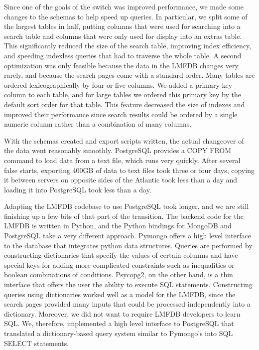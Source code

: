 \documentclass{article}
\begin{document}
Since one of the goals of the switch was improved performance, we made some changes to the schemas to help speed up queries.
In particular, we split some of the largest tables in half, putting columns that were used for searching into a search table and columns that were only used for display into an extras table.
This significantly reduced the size of the search table, improving index efficiency, and speeding indexless queries that had to traverse the whole table.
A second optimization was only feasible because the data in the LMFDB changes very rarely, and because the search pages come with a standard order.
Many tables are ordered lexicographically by four or five columns.
We added a primary key column to each table, and for large tables we ordered this primary key by the default sort order for that table.
This feature decreased the size of indexes and improved their performance since search results could be ordered by a single numeric column rather than a combination of many columns.

With the schemas created and export scripts written, the actual changeover of the data went reasonably smoothly.
PostgreSQL provides a COPY FROM command to load data from a text file, which runs very quickly.
After several false starts, exporting 400GB of data to text files took three or four days, copying it between servers on opposite sides of the Atlantic took less than a day and loading it into PostgreSQL took less than a day.

Adapting the LMFDB codebase to use PostgreSQL took longer, and we are still finishing up a few bits of that part of the transition.
The backend code for the LMFDB is written in Python, and the Python bindings for MongoDB and PostgreSQL take a very different approach.
Pymongo offers a high level interface to the database that integrates python data structures.
Queries are performed by constructing dictionaries that specify the values of certain columns and have special keys for adding more complicated constraints such as inequalities or boolean combinations of conditions.
Psycopg2, on the other hand, is a thin interface that offers the user the ability to execute SQL statements.
Constructing queries using dictionaries worked well as a model for the LMFDB, since the search pages provided many inputs that could be processed independently into a dictionary.
Moreover, we did not want to require LMFDB developers to learn SQL.
We, therefore, implemented a high level interface to PostgreSQL that translated a dictionary-based query system similar to Pymongo's into SQL SELECT statements.
\end{document}
